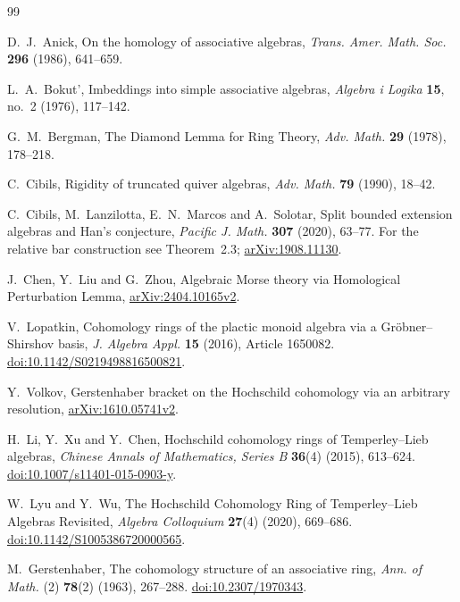 \documentclass[a4paper,11pt,oneside,reqno]{amsart}
\theoremstyle{definition}
\numberwithin{equation}{section}
\begin{document}
\begin{thebibliography}{99}
		
		D.~J.~Anick,
		On the homology of associative algebras,
		\emph{Trans. Amer. Math. Soc.} \textbf{296} (1986), 641--659.
		
		L.~A.~Bokut',
		Imbeddings into simple associative algebras,
		\emph{Algebra i Logika} \textbf{15}, no.~2 (1976), 117--142.
		
		G.~M.~Bergman,
		The Diamond Lemma for Ring Theory,
		\emph{Adv. Math.} \textbf{29} (1978), 178--218.
		
		C.~Cibils,
		Rigidity of truncated quiver algebras,
		\emph{Adv. Math.} \textbf{79} (1990), 18--42.
		
		C.~Cibils, M.~Lanzilotta, E.~N.~Marcos and A.~Solotar,
		Split bounded extension algebras and Han's conjecture,
		\emph{Pacific J. Math.} \textbf{307} (2020), 63--77.
		For the relative bar construction see Theorem~2.3;
		\href{https://arxiv.org/abs/1908.11130}{arXiv:1908.11130}.
		
		J.~Chen, Y.~Liu and G.~Zhou,
		Algebraic Morse theory via Homological Perturbation Lemma,
		\href{https://arxiv.org/abs/2404.10165v2}{arXiv:2404.10165v2}.
		
		V.~Lopatkin,
		Cohomology rings of the plactic monoid algebra via a
		Gr\"obner--Shirshov basis,
		\emph{J. Algebra Appl.} \textbf{15} (2016), Article 1650082.
		\href{https://doi.org/10.1142/S0219498816500821}
		{doi:10.1142/S0219498816500821}.
		
		
		Y.~Volkov,
		Gerstenhaber bracket on the Hochschild cohomology via an arbitrary
		resolution,
		\href{https://arxiv.org/abs/1610.05741v2}{arXiv:1610.05741v2}.
		
		
		H.~Li, Y.~Xu and Y.~Chen,
		Hochschild cohomology rings of Temperley--Lieb algebras,
		\emph{Chinese Annals of Mathematics, Series B}
		\textbf{36}(4) (2015), 613--624.
		\href{https://doi.org/10.1007/s11401-015-0903-y}
		{doi:10.1007/s11401-015-0903-y}.
		
		W.~Lyu and Y.~Wu,
		The Hochschild Cohomology Ring of Temperley--Lieb Algebras Revisited,
		\emph{Algebra Colloquium}
		\textbf{27}(4) (2020), 669--686.
		\href{https://doi.org/10.1142/S1005386720000565}
		{doi:10.1142/S1005386720000565}.
		
		M.~Gerstenhaber,
		The cohomology structure of an associative ring,
		\emph{Ann. of Math.} (2) \textbf{78}(2) (1963), 267--288.
		\href{https://doi.org/10.2307/1970343}{doi:10.2307/1970343}.
		

\end{thebibliography}
\end{document}
